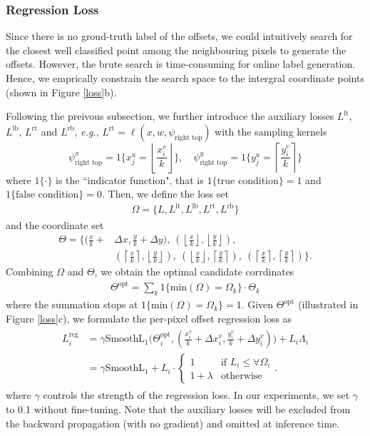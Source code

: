 \documentclass[10pt,twocolumn,letterpaper]{article}
\begin{document}
\subsubsection{Regression Loss}
Since there is no groud-truth label of the offsets, we could intuitively search for the closest well classified point among the neighbouring  pixels to generate the offsets. However, the brute search is time-consuming for online label generation. Hence, we emprically constrain the search space to the intergral coordinate points (shown in Figure \ref{loss}b). 

Following the preivous subsection, we further introduce the auxiliary losses $L^{\text{lt}}$,  $L^{\text{lb}}$, $L^{\text{rt}}$ and $L^{\text{rb}}$, \textit{e.g.}, $L^{\text{rt}}=\ell(x,w,\psi_{\text{right top}})$ with the sampling kernels
\begin{equation*}
\psi_{\text{right top}}^x=1\{x_j^u=\left\lfloor\frac{x_i^v}{k}\right\rfloor\},\quad\psi_{\text{right top}}^y=1\{y_j^u=\left\lceil\frac{y_i^v}{k}\right\rceil\}
\end{equation*}
where $1\{\cdot\}$ is the ``indicator function", that is $1\{\text{true condition}\}=1$ and $1\{\text{false condition}\}=0$. Then, we define the loss set
\begin{align*}
\Omega=\{L,L^{\text{lt}}, L^{\text{lb}},L^{\text{rt}},L^{\text{rb}}\}
\end{align*}
and the coordinate set
\begin{align*}
\Theta=\Big\{(\frac{x}{k}+&\Delta x,\frac{y}{k}+\Delta y),~(\left \lfloor\frac{x}{k}\right \rfloor,\left\lfloor\frac{y}{k}\right\rfloor),\\&(\left\lceil\frac{x}{k}\right\rceil,\left\lfloor\frac{y}{k}\right\rfloor),
~(\left\lfloor\frac{x}{k}\right\rfloor,\left\lceil\frac{y}{k}\right\rceil),~ (\left\lceil\frac{x}{k}\right\rceil,\left\lceil\frac{y}{k}\right\rceil)\Big\}.
\end{align*}
Combining $\Omega$ and $\Theta$, we obtain the optimal candidate corrdinates
\begin{align*}
\Theta^{\text{opt}}=\sum_{k}1\{\text{min}(\Omega)=\Omega_k\}\cdot\Theta_k
\end{align*}
where the summation stops at $1\{\text{min}(\Omega)=\Omega_k\}=1$. Given $\Theta^{\text{opt}}$ (illustrated in Figure \ref{loss}c), we formulate the per-pixel offset regression loss as
\begin{align}
\begin{aligned}
L^{\text{reg}}_i&=\gamma\text{SmoothL}_1\Big(\Theta^{\text{opt}}_i,(\frac{x_i^v}{k}+\Delta x_i^v,\frac{y_i^v}{k}+\Delta y_i^v)\Big)+L_i\Lambda_i\\
&=\gamma\text{SmoothL}_1+L_i\cdot
\begin{cases}
1 &\text{if  } L_i\leq\forall\Omega_i\\
1+\lambda &\text{otherwise}
\end{cases}.
\end{aligned}
\end{align}
where $\gamma$ controls the strength of the regression loss. In our experiments, we set $\gamma$ to 0.1 without fine-tuning. Note that the auxiliary losses will be excluded from the backward propagation (with no gradient) and omitted at inference time. 
\end{document}
